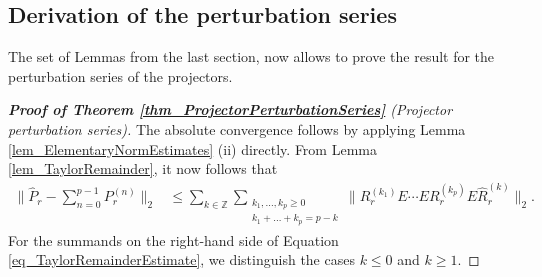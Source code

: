 \documentclass[a4paper,11pt]{article} %
\numberwithin{equation}{section}
\theoremstyle{definition}
\theoremstyle{remark}
\theoremstyle{plain}
\begin{document}

\subsection{Derivation of the perturbation series}%
\label{ssec_DerivationOfThePerturbationSeries}

The set of Lemmas from the last section, now allows to prove the result for the perturbation series of the projectors.

\begin{proof}[\normalfont \textbf{Proof of Theorem \ref{thm_ProjectorPerturbationSeries}} (Projector perturbation series)]%
  \label{prf_ProjectorPerturbationSeries} 
  The absolute convergence follows by applying Lemma \ref{lem_ElementaryNormEstimates} (ii) directly.
  From Lemma \ref{lem_TaylorRemainder}, it now follows that 
  \begin{align}
    \label{eq_TaylorRemainderEstimate}
          \| \widehat{P}_{r} - \sum_{ n = 0 }^{ p - 1 }  P_{r}^{ (n) } \|_{2} 
    & \le 
          \sum_{ k \in \mathbb{Z} } 
          \sum_{ \substack{ k_{1}, \dots, k_{p} \ge 0 \\
                            k_{1} + \dots + k_{p} = p - k 
                          }
               } 
          \| R_{r}^{ ( k_{1} ) } E \cdots E R_{r}^{ ( k_{p} ) } 
             E \widehat{R}_{r}^{ (k) } 
          \|_{2}.
  \end{align}
  For the summands on the right-hand side of Equation
  \eqref{eq_TaylorRemainderEstimate}, we distinguish the cases \( k \le 0 \)
  and \( k \ge 1 \). 


\end{proof}
\end{document}
